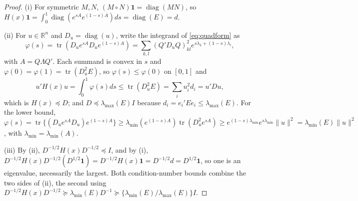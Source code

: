 \documentclass[11pt]{article}
\newcommand{\R}{\mathbb{R}}
\newcommand{\tr}{\operatorname{tr}}
\newcommand{\diag}{\operatorname{diag}}
\newcommand{\one}{\mathbf{1}}
\begin{document}
\begin{proof}
(i) For symmetric $M,N$, $(M\circ N)\one=\diag(MN)$, so
$H(x)\one=\int_{0}^{1}\diag(e^{sA}e^{(1-s)A})ds=\diag(E)=d$.

(ii) For $u\in\R^{n}$ and $D_u=\diag(u)$, write the integrand of
\eqref{eq:quadform} as
\[
\varphi(s)=\tr(D_ue^{sA}D_ue^{(1-s)A})
=\sum_{k,l}(Q'D_uQ)_{kl}^{2}e^{s\lambda_k+(1-s)\lambda_l},
\]
with $A=Q\Lambda Q'$. Each summand is convex in $s$ and
$\varphi(0)=\varphi(1)=\tr(D_u^{2}E)$, so $\varphi(s)\leq\varphi(0)$ on
$[0,1]$ and
\[
u'H(x)u=\int_{0}^{1}\varphi(s)ds\leq\tr(D_u^{2}E)
=\sum_i u_i^{2}d_i=u'Du ,
\]
which is $H(x)\preceq D$; and $D\preceq\lambda_{\max}(E)I$ because
$d_i=e_i'Ee_i\leq\lambda_{\max}(E)$. For the lower bound,
$\varphi(s)=\tr\{(D_ue^{sA}D_u)e^{(1-s)A}\}
\geq\lambda_{\min}(e^{(1-s)A})\tr(D_u^{2}e^{sA})
\geq e^{(1-s)\lambda_{\min}}e^{s\lambda_{\min}}\|u\|^{2}
=\lambda_{\min}(E)\|u\|^{2}$, with
$\lambda_{\min}=\lambda_{\min}(A)$.

(iii) By (ii), $D^{-1/2}H(x)D^{-1/2}\preceq I$, and by (i),
$D^{-1/2}H(x)D^{-1/2}(D^{1/2}\one)=D^{-1/2}H(x)\one=D^{-1/2}d
=D^{1/2}\one$, so one is an eigenvalue, necessarily the largest. Both
condition-number bounds combine the two sides of (ii), the second using
$D^{-1/2}H(x)D^{-1/2}\succeq\lambda_{\min}(E)D^{-1}\succeq
\{\lambda_{\min}(E)/\lambda_{\max}(E)\}I$.
\end{proof}
\end{document}
